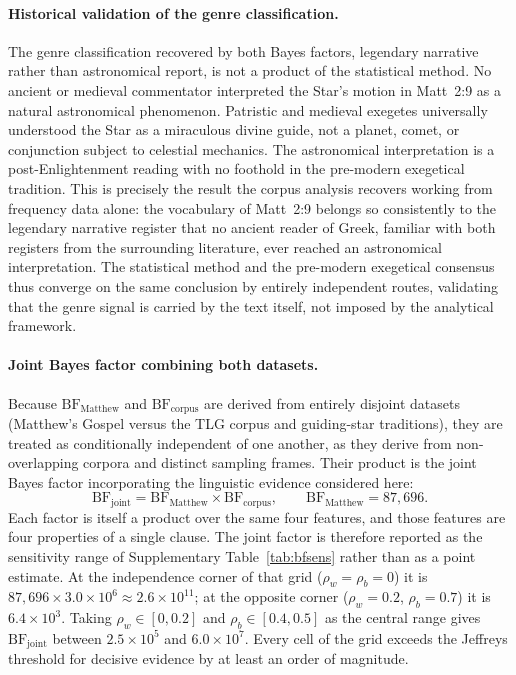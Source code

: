 \documentclass[11pt,a4paper]{article}
\begin{document}
\paragraph{Historical validation of the genre classification.}

The genre classification recovered by both Bayes factors, legendary narrative
rather than astronomical report, is not a product of the statistical method.
No ancient or medieval commentator interpreted the Star's motion in Matt~2:9
as a natural astronomical phenomenon\cite{adair2012}. Patristic and medieval
exegetes universally understood the Star as a miraculous divine guide, not a
planet, comet, or conjunction subject to celestial mechanics. The astronomical
interpretation is a post-Enlightenment reading with no foothold in the
pre-modern exegetical tradition. This is precisely the result the corpus
analysis recovers working from frequency data alone: the vocabulary of Matt~2:9
belongs so consistently to the legendary narrative register that no ancient
reader of Greek, familiar with both registers from the surrounding literature,
ever reached an astronomical interpretation. The statistical method and the
pre-modern exegetical consensus thus converge on the same conclusion by entirely
independent routes, validating that the genre signal is carried by the text
itself, not imposed by the analytical framework.

\paragraph{Joint Bayes factor combining both datasets.}

Because $\mathrm{BF}_\text{Matthew}$ and $\mathrm{BF}_\text{corpus}$ are derived
from entirely disjoint datasets (Matthew's Gospel versus the TLG corpus and
guiding-star traditions), they are treated as conditionally independent of one
another, as they derive from non-overlapping corpora and distinct sampling
frames. Their product is the joint Bayes factor incorporating the linguistic
evidence considered here:
\begin{equation}
  \mathrm{BF}_\text{joint}
    = \mathrm{BF}_\text{Matthew} \times \mathrm{BF}_\text{corpus},
    \qquad \mathrm{BF}_\text{Matthew} = 87{,}696 .
  \label{eq:bf_joint}
\end{equation}
Each factor is itself a product over the same four features, and those features
are four properties of a single clause. The joint factor is therefore reported
as the sensitivity range of Supplementary Table~\ref{tab:bfsens} rather than as a point
estimate. At the independence corner of that grid
($\rho_w = \rho_b = 0$) it is $87{,}696 \times 3.0\times10^{6} \approx
2.6\times10^{11}$; at the opposite corner ($\rho_w = 0.2$, $\rho_b = 0.7$) it
is $6.4\times10^{3}$. Taking $\rho_w \in [0, 0.2]$ and
$\rho_b \in [0.4, 0.5]$ as the central range gives $\mathrm{BF}_\text{joint}$
between $2.5\times10^{5}$ and $6.0\times10^{7}$. Every cell of the grid
exceeds the Jeffreys threshold for decisive evidence by at least an order of
magnitude.
\end{document}
